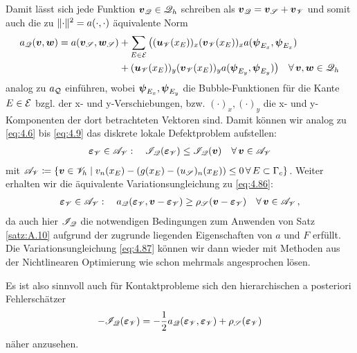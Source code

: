 Damit lässt sich jede Funktion $\boldsymbol v_{\mathscr Q} \in \mathscr Q_h$ schreiben als $\boldsymbol v_{\mathscr Q} = \boldsymbol v_{\mathscr S}+\boldsymbol v_{\mathscr V}$ und somit auch die zu $\lVert \cdot\rVert^2 = a(\cdot,\cdot)$ äquivalente Norm
\begin{align*}
	a_{\mathscr Q} (\boldsymbol v, \boldsymbol w) = a(\boldsymbol v_{\mathscr S},\boldsymbol w_{\mathscr S})  &+ \sum_{E\in \mathcal E}  \big((\boldsymbol u_{\mathscr V}(x_E))_x(\boldsymbol v_{\mathscr V}(x_E))_x a(\boldsymbol \psi_{E_x},\boldsymbol \psi_{E_x}) \\
	& + (\boldsymbol u_{\mathscr V}(x_E))_y(\boldsymbol v_{\mathscr V}(x_E))_y a(\boldsymbol \psi_{E_y},\boldsymbol \psi_{E_y})\big) \quad \forall \, \boldsymbol v, \boldsymbol w \in \mathscr Q_h
\end{align*}
analog zu $a_{\mathcal Q}$ einführen, wobei $\boldsymbol \psi_{E_x}, \boldsymbol \psi_{E_y}$  die  Bubble-Funktionen für die Kante $E\in \mathcal E$ bzgl. der x- und y-Verschiebungen,  bzw. $(\cdot)_x,(\cdot)_y$ die x- und y- Komponenten der dort betrachteten Vektoren sind. Damit können wir analog zu \eqref{eq:4.6} bis \eqref{eq:4.9} das diskrete lokale Defektproblem aufstellen:
\begin{align}\label{eq:4.86}
	\boldsymbol {\varepsilon}_{\mathscr V} \in \mathscr A_{\mathscr V}: \quad {\mathscr I}_{\mathscr Q} (\boldsymbol {\varepsilon}_{\mathscr V}) \le \mathscr I_{\mathscr Q} (\boldsymbol v) \quad \forall \, \boldsymbol v \in \mathscr A_{\mathscr V}
\end{align}
mit ${\mathscr A}_{\mathscr V} \coloneqq \{\boldsymbol v \in \mathscr V_h \mid  v_n (x_E) - (g(x_E)-(u_{\mathscr S})_n (x_E)) \le 0 \, \forall \, E \subset \Gamma_c \}$. Weiter erhalten wir die äquivalente Variationsungleichung zu \eqref{eq:4.86}:
\begin{align}\label{eq:4.87}
	\boldsymbol {\varepsilon}_{\mathscr V} \in \mathscr A_{\mathscr V}: \quad a_{\mathscr Q} (\boldsymbol {\varepsilon}_{\mathscr V},\boldsymbol v - \boldsymbol{\varepsilon}_{\mathscr V}) \ge \rho_{\mathscr S} (\boldsymbol v-\boldsymbol{\varepsilon}_{\mathscr V}) \quad \forall \, \boldsymbol v \in \mathscr A_{\mathscr V} \, , 
\end{align}
da auch hier $\mathscr I_{\mathscr Q}$ die notwendigen Bedingungen zum Anwenden von Satz \ref{satz:A.10} aufgrund der zugrunde liegenden Eigenschaften von $a$ und $F$ erfüllt. Die Variationsungleichung \eqref{eq:4.87} können wir dann wieder mit Methoden aus der Nichtlinearen Optimierung wie schon mehrmals angesprochen lösen.

Es ist also sinnvoll auch für Kontaktprobleme sich den hierarchischen a posteriori Fehlerschätzer 
\[
	-\mathscr I_{\mathscr Q} (\boldsymbol {\varepsilon}_{\mathscr V}) = -\frac 12 a_{\mathscr Q} (\boldsymbol{\varepsilon}_{\mathscr V},\boldsymbol{\varepsilon}_{\mathscr V}) + \rho_{\mathscr S}(\boldsymbol{\varepsilon}_{\mathscr V})
\]
näher anzusehen.



